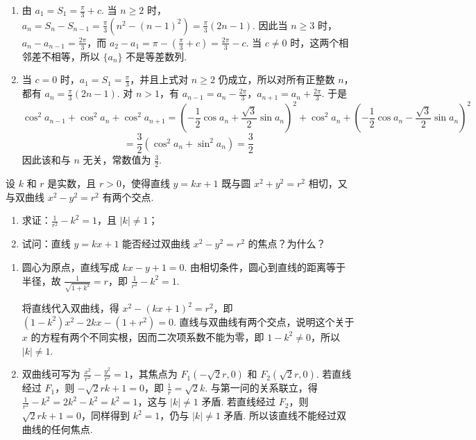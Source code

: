 \begin{solution}
\begin{enumerate}
\item 由 \(a_1=S_1=\frac\pi3+c\). 当 \(n\geqslant2\) 时，\(a_n=S_n-S_{n-1}=\frac\pi3\left(n^2-(n-1)^2\right)=\frac\pi3(2n-1)\). 因此当 \(n\geqslant3\) 时，\(a_n-a_{n-1}=\frac{2\pi}{3}\)，而 \(a_2-a_1=\pi-\left(\frac\pi3+c\right)=\frac{2\pi}{3}-c\). 当 \(c\neq0\) 时，这两个相邻差不相等，所以 \(\{a_n\}\) 不是等差数列.
\item 当 \(c=0\) 时，\(a_1=S_1=\frac\pi3\)，并且上式对 \(n\geqslant2\) 仍成立，所以对所有正整数 \(n\)，都有 \(a_n=\frac\pi3(2n-1)\). 对 \(n>1\)，有 \(a_{n-1}=a_n-\frac{2\pi}{3}\)，\(a_{n+1}=a_n+\frac{2\pi}{3}\). 于是
\[
\cos^2a_{n-1}+\cos^2a_n+\cos^2a_{n+1}
=\left(-\frac12\cos a_n+\frac{\sqrt3}{2}\sin a_n\right)^2+\cos^2a_n+\left(-\frac12\cos a_n-\frac{\sqrt3}{2}\sin a_n\right)^2
\]
\[
=\frac32\left(\cos^2a_n+\sin^2a_n\right)=\frac32
\]
因此该和与 \(n\) 无关，常数值为 \(\frac32\).
\end{enumerate}
\end{solution}

\begin{problem}
设 \(k\) 和 \(r\) 是实数，且 \(r > 0\)，使得直线 \(y = kx + 1\) 既与圆 \(x^2 + y^2 = r^2\) 相切，又与双曲线 \(x^2 - y^2 = r^2\) 有两个交点.
\begin{enumerate}
\item 求证：\(\frac{1}{r^2} - k^2 = 1\)，且 \(|k| \neq 1\)；
\item 试问：直线 \(y = kx + 1\) 能否经过双曲线 \(x^2 - y^2 = r^2\) 的焦点？为什么？
\end{enumerate}
\end{problem}

\begin{solution}
\begin{enumerate}
\item 圆心为原点，直线写成 \(kx-y+1=0\). 由相切条件，圆心到直线的距离等于半径，故 \(\frac1{\sqrt{1+k^2}}=r\)，即 \(\frac1{r^2}-k^2=1\).

将直线代入双曲线，得 \(x^2-(kx+1)^2=r^2\)，即 \((1-k^2)x^2-2kx-(1+r^2)=0\). 直线与双曲线有两个交点，说明这个关于 \(x\) 的方程有两个不同实根，因而二次项系数不能为零，即 \(1-k^2\neq0\)，所以 \(|k|\neq1\).
\item 双曲线可写为 \(\frac{x^2}{r^2}-\frac{y^2}{r^2}=1\)，其焦点为 \(F_1(-\sqrt2r,0)\) 和 \(F_2(\sqrt2r,0)\). 若直线经过 \(F_1\)，则 \(-\sqrt2rk+1=0\)，即 \(\frac1r=\sqrt2k\). 与第一问的关系联立，得 \(\frac1{r^2}-k^2=2k^2-k^2=k^2=1\)，这与 \(|k|\neq1\) 矛盾. 若直线经过 \(F_2\)，则 \(\sqrt2rk+1=0\)，同样得到 \(k^2=1\)，仍与 \(|k|\neq1\) 矛盾. 所以该直线不能经过双曲线的任何焦点.
\end{enumerate}
\end{solution}
